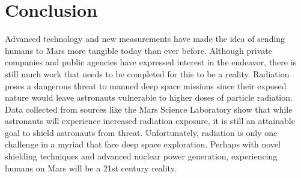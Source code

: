 \section{Conclusion}

Advanced technology and new measurements have made the idea of sending humans to Mars more tangible today than ever before. Although private companies and public agencies have expressed interest in the endeavor, there is still much work that needs to be completed for this to be a reality. Radiation poses a dangerous threat to manned deep space missions since their exposed nature would leave astronauts vulnerable to higher doses of particle radiation. Data collected from sources like the Mars Science Laboratory show that while astronauts will experience increased radiation exposure, it is still an attainable goal to shield astronauts from threat. Unfortunately, radiation is only one challenge in a myriad that face deep space exploration. Perhaps with novel shielding techniques and advanced nuclear power generation, experiencing humans on Mars will be a 21st century reality.
